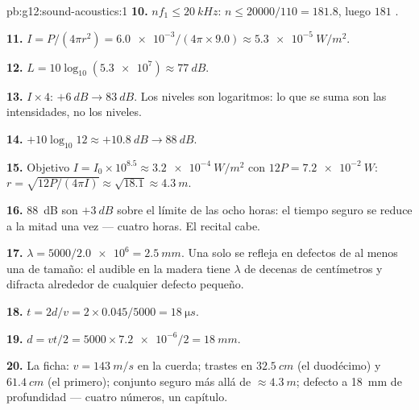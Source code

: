 \begin{solution}{pb:g12:sound-acoustics:1}
\textbf{10.} $nf_1 \le \qty{20}{kHz}$: $n \le 20000/110 = 181.8$, luego
$181$ .

\textbf{11.} $I = P/(4\pi r^2) = \num{6.0e-3}/(4\pi \times 9.0)
\approx \qty{5.3e-5}{W/m^2}$.

\textbf{12.} $L = 10\log_{10}(\num{5.3e7}) \approx \qty{77}{dB}$.

\textbf{13.} $I \times 4$: $+\qty{6}{dB} \to \qty{83}{dB}$. Los niveles
son logaritmos: lo que se suma son las intensidades, no los niveles.

\textbf{14.} $+10\log_{10}12 \approx +\qty{10.8}{dB} \to \qty{88}{dB}$.

\textbf{15.} Objetivo $I = I_0 \times 10^{8.5} \approx
\qty{3.2e-4}{W/m^2}$ con $12P = \qty{7.2e-2}{W}$:
$r = \sqrt{12P/(4\pi I)} \approx \sqrt{18.1} \approx \qty{4.3}{m}$.

\textbf{16.} \qty{88}{dB} son $+\qty{3}{dB}$ sobre el límite de las
ocho horas: el tiempo seguro se reduce a la mitad una vez --- cuatro
horas. El recital cabe.

\textbf{17.} $\lambda = 5000/\num{2.0e6} = \qty{2.5}{mm}$. Una  solo
se refleja en defectos de al menos una  de tamaño: el
 audible en la madera tiene $\lambda$ de decenas de centímetros y
difracta alrededor de cualquier defecto pequeño.

\textbf{18.} $t = 2d/v = 2 \times 0.045/5000 = \qty{18}{\micro s}$.

\textbf{19.} $d = vt/2 = 5000 \times \num{7.2e-6}/2 = \qty{18}{mm}$.

\textbf{20.} La ficha: $v = \qty{143}{m/s}$ en la cuerda; trastes en
$\qty{32.5}{cm}$ (el duodécimo) y $\qty{61.4}{cm}$ (el primero);
conjunto seguro más allá de $\approx \qty{4.3}{m}$; defecto a
\qty{18}{mm} de profundidad --- cuatro números, un capítulo.
\end{solution}
